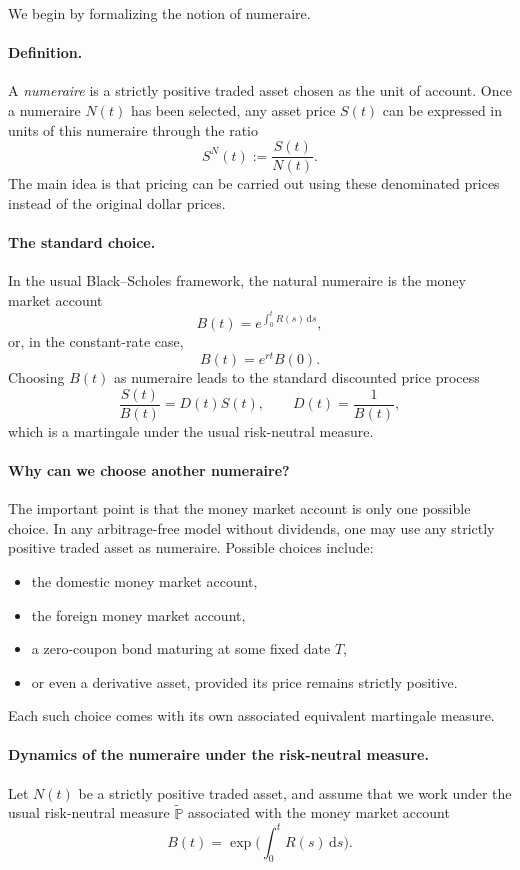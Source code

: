 \documentclass[11pt]{article}
\theoremstyle{definition}
\theoremstyle{plain}
\begin{document}
We begin by formalizing the notion of numeraire.

\paragraph{Definition.}
A \emph{numeraire} is a strictly positive traded asset chosen as the
unit of account.
Once a numeraire \(N(t)\) has been selected, any asset price \(S(t)\)
can be expressed in units of this numeraire through the ratio
\[
S^N(t):=\frac{S(t)}{N(t)}.
\]
The main idea is that pricing can be carried out using these
denominated prices instead of the original dollar prices.  

\paragraph{The standard choice.}
In the usual Black--Scholes framework, the natural numeraire is the
money market account
\[
B(t)=e^{\int_0^t R(s)\,\mathrm{d}s},
\]
or, in the constant-rate case,
\[
B(t)=e^{rt}B(0).
\]
Choosing \(B(t)\) as numeraire leads to the standard discounted price
process
\[
\frac{S(t)}{B(t)}=D(t)S(t),
\qquad D(t)=\frac1{B(t)},
\]
which is a martingale under the usual risk-neutral measure. 

\paragraph{Why can we choose another numeraire?}
The important point is that the money market account is only one
possible choice.
In any arbitrage-free model without dividends, one may use any strictly
positive traded asset as numeraire.
Possible choices include:
\begin{itemize}[leftmargin=1.4em]
\item the domestic money market account,
\item the foreign money market account,
\item a zero-coupon bond maturing at some fixed date \(T\),
\item or even a derivative asset, provided its price remains strictly positive.
\end{itemize}
Each such choice comes with its own associated equivalent martingale
measure. 
\paragraph{Dynamics of the numeraire under the risk-neutral measure.}

Let \(N(t)\) be a strictly positive traded asset, and assume that we work
under the usual risk-neutral measure \(\widetilde{\mathbb P}\)
associated with the money market account
\[
B(t)=\exp\!\Big(\int_0^t R(s)\,\mathrm{d}s\Big).
\]
\end{document}
